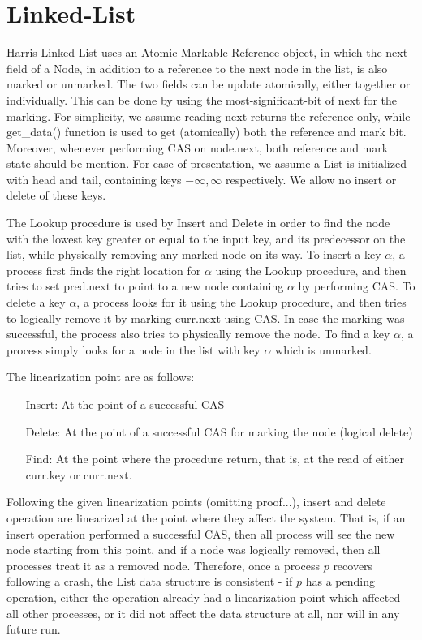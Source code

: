\section{Linked-List}

Harris Linked-List uses an Atomic-Markable-Reference object, in which the next field of a Node, in addition to a reference to the next node in the list, is also marked or unmarked. The two fields can be update atomically, either together or individually. This can be done by using the most-significant-bit of next for the marking. For simplicity, we assume reading next returns the reference only, while get\_data() function is used to get (atomically) both the reference and mark bit. Moreover, whenever performing CAS on node.next, both reference and mark state should be mention.
For ease of presentation, we assume a List is initialized with head and tail, containing keys $-\infty, \infty$ respectively. We allow no insert or delete of these keys.


The Lookup procedure is used by Insert and Delete in order to find the node with the lowest key greater or equal to the input key, and its predecessor on the list, while physically removing any marked node on its way. To insert a key $\alpha$, a process first finds the right location for $\alpha$ using the Lookup procedure, and then tries to set pred.next to point to a new node containing $\alpha$ by performing CAS. To delete a key $\alpha$, a process looks for it using the Lookup procedure, and then tries to logically remove it by marking curr.next using CAS. In case the marking was successful, the process also tries to physically remove the node. To find a key $\alpha$, a process simply looks for a node in the list with key $\alpha$ which is unmarked.

The linearization point are as follows:
\begin{itemize}
	\item [Insert:] At the point of a successful CAS
	\item [Delete:] At the point of a successful CAS for marking the node (logical delete)
	\item [Find:] At the point where the procedure return, that is, at the read of either curr.key or curr.next.
\end{itemize}

Following the given linearization points (omitting proof...), insert and delete operation are linearized at the point where they affect the system. That is, if an insert operation performed a successful CAS, then all process will see the new node starting from this point, and if a node was logically removed, then all processes treat it as a removed node. Therefore, once a process $p$ recovers following a crash, the List data structure is consistent - if $p$ has a pending operation, either the operation already had a linearization point which affected all other processes, or it did not affect the data structure at all, nor will in any future run.

